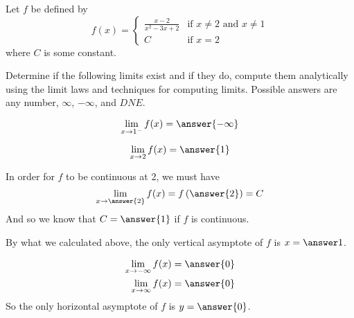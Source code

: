 \documentclass{ximera}
\author{Nela Lakos \and Kyle Parsons}
\begin{document}
\begin{exercise}

Let $f$ be defined by
\[
f(x) = 
\begin{cases} 
\frac{x-2}{x^2-3x+2} & \text{if } x\neq 2 \text{ and } x\neq 1 \\
C & \text{if } x=2
   \end{cases}
\]
where $C$ is some constant.

Determine if the following limits exist and if they do, compute them analytically using the limit laws and techniques for computing limits.  Possible answers are any number, $\infty$, $-\infty$, and $DNE$.

\begin{exercise}
\[
\lim_{x\to1^-}f(x) = \answer{-\infty}
\]
\begin{exercise}
\[
\lim_{x\to2}f(x) = \answer{1}
\]
\end{exercise}
\end{exercise}

\begin{exercise}
In order for $f$ to be continuous at 2, we must have
\[
\lim_{x\to\answer{2}}f(x) = f\left(\answer{2}\right) = C
\]
And so we know that $C=\answer{1}$ if $f$ is continuous.
\end{exercise}

\begin{exercise}
By what we calculated above, the only vertical asymptote of $f$ is $x=\answer1$.
\end{exercise}

\begin{exercise}
\begin{align*}
\lim_{x\to-\infty}f(x) &= \answer{0}\\
\lim_{x\to\infty}f(x) &= \answer{0}
\end{align*}
So the only horizontal asymptote of $f$ is $y=\answer{0}$.
\end{exercise}

\end{exercise}
\end{document}
